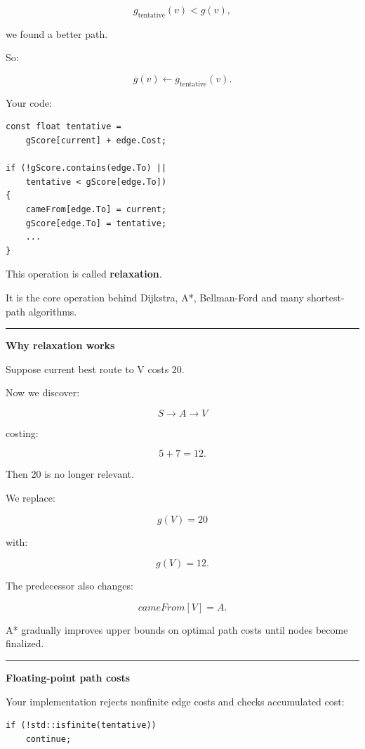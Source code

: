 \[
g_{\text{tentative}}(v)<g(v),
\]

we found a better path.

So:

\[
g(v)
\leftarrow
g_{\text{tentative}}(v).
\]

Your code:

\begin{verbatim}
const float tentative =
    gScore[current] + edge.Cost;

if (!gScore.contains(edge.To) ||
    tentative < gScore[edge.To])
{
    cameFrom[edge.To] = current;
    gScore[edge.To] = tentative;
    ...
}
\end{verbatim}

This operation is called \textbf{relaxation}.

It is the core operation behind Dijkstra, A*, Bellman-Ford and many shortest-path algorithms.

\begin{center}\rule{0.5\linewidth}{0.5pt}\end{center}

\textbf{Why relaxation works}

Suppose current best route to V costs 20.

Now we discover:

\[
S\rightarrow A\rightarrow V
\]

costing:

\[
5+7=12.
\]

Then 20 is no longer relevant.

We replace:

\[
g(V)=20
\]

with:

\[
g(V)=12.
\]

The predecessor also changes:

\[
cameFrom[V]=A.
\]

A* gradually improves upper bounds on optimal path costs until nodes become finalized.

\begin{center}\rule{0.5\linewidth}{0.5pt}\end{center}

\textbf{Floating-point path costs}

Your implementation rejects nonfinite edge costs and checks accumulated cost:

\begin{verbatim}
if (!std::isfinite(tentative))
    continue;
\end{verbatim}

